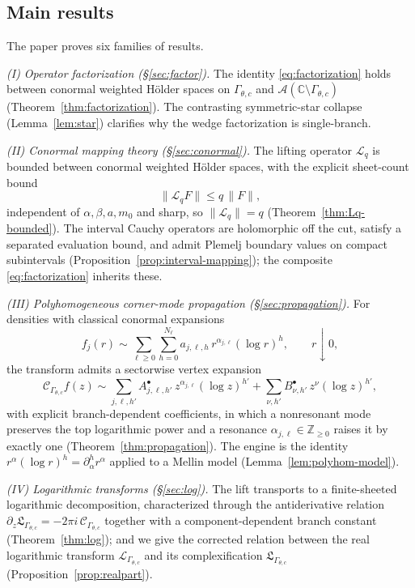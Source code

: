 \documentclass[pdflatex,sn-mathphys-num]{sn-jnl}%
\newcommand{\C}{\mathbb{C}}
\newcommand{\Z}{\mathbb{Z}}
\newcommand{\Cau}{\mathcal{C}}
\newcommand{\Lop}{\mathcal{L}}
\newcommand{\Lcx}{\mathfrak{L}}
\newcommand{\Gw}{\Gamma_{\theta,c}}
\newcommand{\Lq}{\mathcal{L}_{q}}
\newcommand{\Ahol}{\mathcal{A}}
\theoremstyle{thmstyleone}
\theoremstyle{thmstyletwo}
\theoremstyle{thmstylethree}
\begin{document}
\subsection{Main results}
The paper proves six families of results.

\emph{(I) Operator factorization (\S\ref{sec:factor}).} The identity
\eqref{eq:factorization} holds between conormal weighted H\"older spaces on
$\Gw$ and $\Ahol(\C\setminus\Gw)$ (Theorem~\ref{thm:factorization}). The
contrasting symmetric-star collapse (Lemma~\ref{lem:star}) clarifies why the
wedge factorization is single-branch.

\emph{(II) Conormal mapping theory (\S\ref{sec:conormal}).} The lifting operator
$\Lq$ is bounded between conormal weighted H\"older spaces, with the explicit
sheet-count bound
\begin{equation}\label{eq:Lq-bound-intro}
  \|\Lq F\|\le q\,\|F\|,
\end{equation}
independent of $\alpha,\beta,a,m_0$ and sharp, so $\|\Lq\|=q$
(Theorem~\ref{thm:Lq-bounded}). The interval Cauchy operators are holomorphic
off the cut, satisfy a separated evaluation bound, and admit Plemelj boundary
values on compact subintervals (Proposition~\ref{prop:interval-mapping}); the
composite \eqref{eq:factorization} inherits these.

\emph{(III) Polyhomogeneous corner-mode propagation (\S\ref{sec:propagation}).}
For densities with classical conormal expansions
\[
  f_j(r)\sim\sum_{\ell\ge0}\sum_{h=0}^{N_\ell}a_{j,\ell,h}\,
     r^{\alpha_{j,\ell}}(\log r)^{h},\qquad r\downarrow0,
\]
the transform admits a sectorwise vertex expansion
\[
  \Cau_{\Gw}f(z)\sim
  \sum_{j,\ell,h'}A^{\bullet}_{j,\ell,h'}\,z^{\alpha_{j,\ell}}(\log z)^{h'}
  +\sum_{\nu,h'}B^{\bullet}_{\nu,h'}\,z^{\nu}(\log z)^{h'},
\]
with explicit branch-dependent coefficients, in which a nonresonant mode
preserves the top logarithmic power and a resonance $\alpha_{j,\ell}\in\Z_{\ge0}$
raises it by exactly one (Theorem~\ref{thm:propagation}). The engine is the
identity $r^{\alpha}(\log r)^{h}=\partial_\alpha^{h}r^{\alpha}$ applied to a
Mellin model (Lemma~\ref{lem:polyhom-model}).

\emph{(IV) Logarithmic transforms (\S\ref{sec:log}).} The lift transports to a
finite-sheeted logarithmic decomposition, characterized through the
antiderivative relation $\partial_z\Lcx_{\Gw}=-2\pi i\,\Cau_{\Gw}$ together with a
component-dependent branch constant (Theorem~\ref{thm:log}); and we give the
corrected relation between the real logarithmic transform $\Lop_{\Gw}$ and its
complexification $\Lcx_{\Gw}$ (Proposition~\ref{prop:realpart}).
\end{document}
